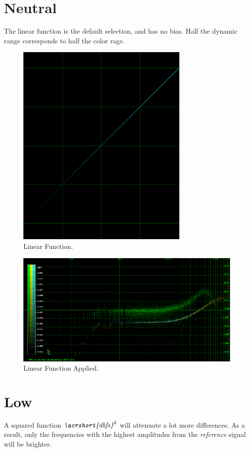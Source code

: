 \documentclass[10pt,a4paper]{report}
\newcommand{\squaredb}{$\textit{\acrshort{dbfs}}^2$}
\begin{document}
\begin{appendices}
\section{Neutral} 

The linear function is the default selection, and has no bias. Half the dynamic range corresponds to half the color rage.

\begin{figure}[H]
	\centering
	\includegraphics[width=0.4\linewidth]{images/colorfilter/BetaFunctionPlot_3.png}
	\caption[Linear]{Linear Function.}
	\label{fig:betafunctionplot3}
\end{figure}

\begin{figure}[H]
	\centering
	\includegraphics[width=1\linewidth]{images/colorfilter/BetaFunctionPlot_3_Data.png}
	\caption[Linear Applied]{Linear Function Applied.}
	\label{fig:betafunctionplot3data}
\end{figure}

\section{Low}

A squared function \squaredb{} will attenuate a lot more differences. As a result, only the frequencies with the highest amplitudes from the \textit{reference} signal will be brighter.


\end{appendices}
\end{document}
